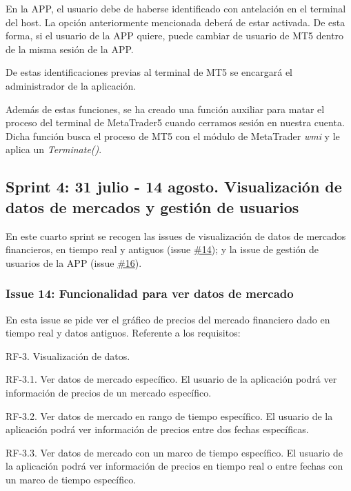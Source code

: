En la APP, el usuario debe de haberse identificado con antelación en el terminal del host. La opción anteriormente mencionada deberá de estar activada. De esta forma, si el usuario de la APP quiere, puede cambiar de usuario de MT5 dentro de la misma sesión de la APP.\newline

De estas identificaciones previas al terminal de MT5 se encargará el administrador de la aplicación.\newline

Además de estas funciones, se ha creado una función auxiliar para matar el proceso del terminal de MetaTrader5 cuando cerramos sesión en nuestra cuenta. Dicha función busca el proceso de MT5 con el módulo de MetaTrader \textit{wmi} y le aplica un \textit{Terminate()}.\newline

\subsection{Sprint 4: 31 julio - 14 agosto. Visualización de datos de mercados y gestión de usuarios}

En este cuarto sprint se recogen las issues de visualización de datos de mercados financieros, en tiempo real y antiguos (issue \href{https://github.com/mcarmona99/TFG/issues/14}{\#14}); y la issue de gestión de usuarios de la APP (issue \href{https://github.com/mcarmona99/TFG/issues/16}{\#16}).\newline

\subsubsection{Issue 14: Funcionalidad para ver datos de mercado}

En esta issue se pide ver el gráfico de precios del mercado financiero dado en tiempo real y datos antiguos. Referente a los requisitos:\newline

RF-3. Visualización de datos.

RF-3.1. Ver datos de mercado específico. El usuario de la aplicación podrá ver información de precios de un mercado específico.

RF-3.2. Ver datos de mercado en rango de tiempo específico. El usuario de la aplicación podrá ver información de precios entre dos fechas específicas.

RF-3.3. Ver datos de mercado con un marco de tiempo específico. El usuario de la aplicación podrá ver información de precios en tiempo real o entre fechas con un marco de tiempo específico.\newline

